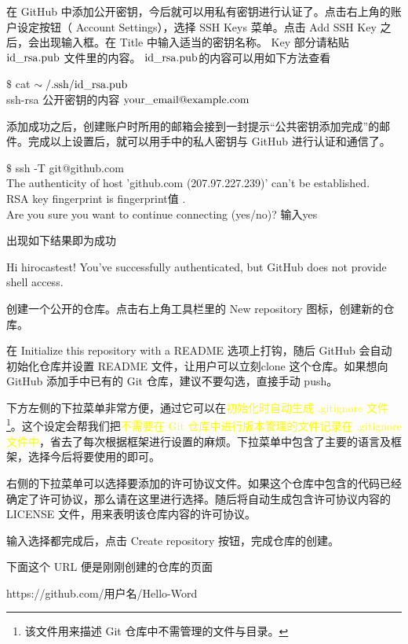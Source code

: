 \documentclass[12pt,a4paper]{article}
\begin{document}
在 GitHub 中添加公开密钥，今后就可以用私有密钥进行认证了。点击右上角的账户设定按钮（ Account Settings），选择 SSH Keys 菜单。点击 Add SSH Key 之后，会出现输入框。在 Title 中输入适当的密钥名称。 Key 部分请粘贴 $\rm id\_rsa.pub$ 文件里的内容。 $\rm id\_rsa.pub$的内容可以用如下方法查看
\begin{tcolorbox}[colback=green!5,colframe=green!40!black,title= ]
$\$$ cat $\rm \sim/.ssh/id\_rsa.pub$ \\
ssh-rsa 公开密钥的内容 $\rm your\_email@example.com$
\end{tcolorbox}
添加成功之后，创建账户时所用的邮箱会接到一封提示“公共密钥添加完成”的邮件。完成以上设置后，就可以用手中的私人密钥与 GitHub 进行认证和通信了。
\begin{tcolorbox}[colback=green!5,colframe=green!40!black,title= ]
$\$$ ssh -T git@github.com \\
The authenticity of host 'github.com (207.97.227.239)' can't be established. \\
RSA key fingerprint is fingerprint值 . \\
Are you sure you want to continue connecting (yes/no)? 输入yes 
\end{tcolorbox}
出现如下结果即为成功 
\begin{tcolorbox}[colback=green!5,colframe=green!40!black,title= ]
Hi hirocastest! You've successfully authenticated, but GitHub does not provide shell access.
\end{tcolorbox}
创建一个公开的仓库。点击右上角工具栏里的 New repository 图标，创建新的仓库。

在 Initialize this repository with a README 选项上打钩，随后 GitHub 会自动初始化仓库并设置 README 文件，让用户可以立刻clone 这个仓库。如果想向 GitHub 添加手中已有的 Git 仓库，建议不要勾选，直接手动 push。

下方左侧的下拉菜单非常方便，通过它可以在\textcolor{yellow}{初始化时自动生成 .gitignore 文件\footnote{该文件用来描述 Git 仓库中不需管理的文件与目录。}}。这个设定会帮我们把\textcolor{yellow}{不需要在 Git 仓库中进行版本管理的文件记录在 .gitignore 文件中}，省去了每次根据框架进行设置的麻烦。下拉菜单中包含了主要的语言及框架，选择今后将要使用的即可。

右侧的下拉菜单可以选择要添加的许可协议文件。如果这个仓库中包含的代码已经确定了许可协议，那么请在这里进行选择。随后将自动生成包含许可协议内容的 LICENSE 文件，用来表明该仓库内容的许可协议。

输入选择都完成后，点击 Create repository 按钮，完成仓库的创建。

下面这个 URL 便是刚刚创建的仓库的页面
\begin{tcolorbox}[colback=green!5,colframe=green!40!black,title= ]
https://github.com/用户名/Hello-Word
\end{tcolorbox}
\end{document}
